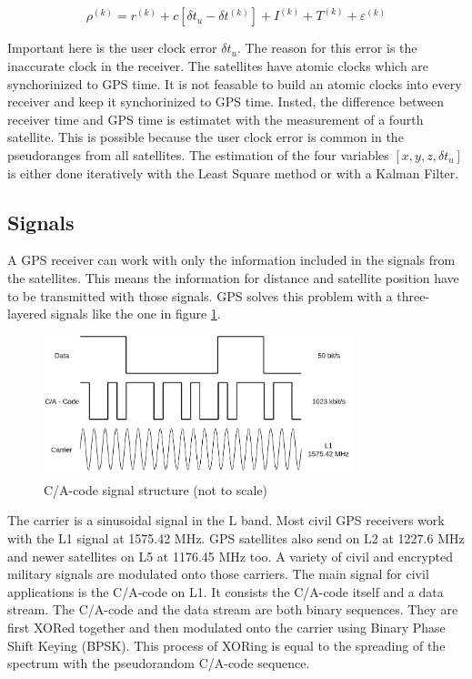 \begin{equation}
 \rho^{(k)} = r^{(k)} + c[\delta t_u - \delta t^{(k)}] + I^{(k)} + T^{(k)} + \varepsilon^{(k)}		\label{eq:pseudorange}
\end{equation}

Important here is the user clock error $\delta t_u$.
The reason for this error is the inaccurate clock in the receiver.
The satellites have atomic clocks which are synchorinized to GPS time.
It is not feasable to build an atomic clocks into every receiver and keep it synchorinized to GPS time.
Insted, the difference between receiver time and GPS time is estimatet with the measurement of a fourth satellite.
This is possible because the user clock error is common in the pseudoranges from all satellites.
The estimation of the four variables $[x, y, z, \delta t_u]$ is either done iteratively with the Least Square method or with a Kalman Filter.

\subsection{Signals}

A GPS receiver can work with only the information included in the signals from the satellites.
This means the information for distance and satellite position have to be transmitted with those signals.
GPS solves this problem with a three-layered signals like the one in figure \ref{fig:signal_structure}.

\begin{figure}[ht]
 \centering
 \includegraphics[width=0.8\textwidth]{images/Signal_Structure.png}
 \caption{C/A-code signal structure (not to scale)}
 \label{fig:signal_structure}
\end{figure}

The carrier is a sinusoidal signal in the L band.
Most civil GPS receivers work with the L1 signal at 1575.42 MHz.
GPS satellites also send on L2 at 1227.6 MHz and newer satellites on L5 at 1176.45 MHz too.
A variety of civil and encrypted military signals are modulated onto those carriers.
The main signal for civil applications is the C/A-code on L1.
It consists the C/A-code itself and a data stream.
The C/A-code and the data stream are both binary sequences.
They are first XORed together and then modulated onto the carrier using Binary Phase Shift Keying (BPSK).
This process of XORing is equal to the spreading of the spectrum with the pseudorandom C/A-code sequence.

